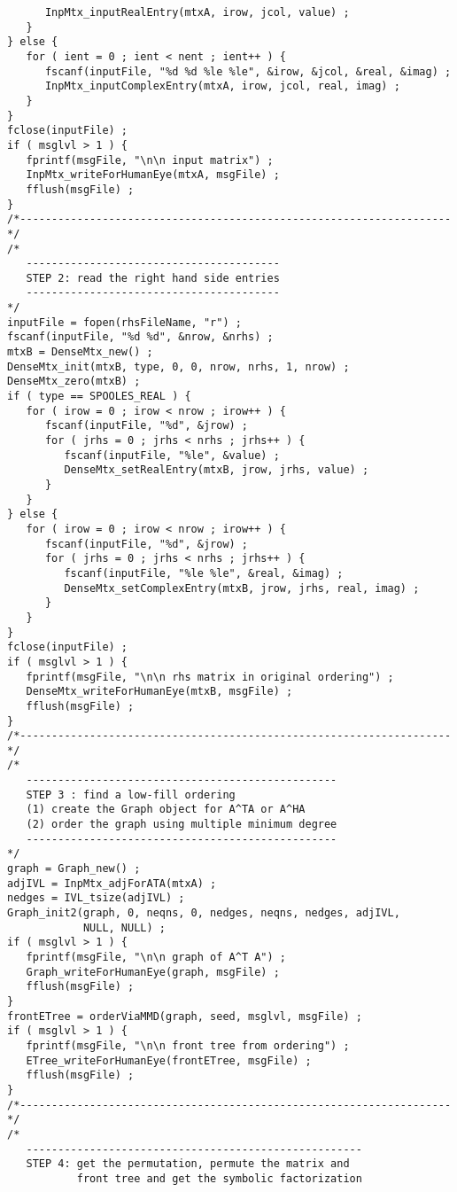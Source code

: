 \begin{verbatim}
      InpMtx_inputRealEntry(mtxA, irow, jcol, value) ;
   }
} else {
   for ( ient = 0 ; ient < nent ; ient++ ) {
      fscanf(inputFile, "%d %d %le %le", &irow, &jcol, &real, &imag) ;
      InpMtx_inputComplexEntry(mtxA, irow, jcol, real, imag) ;
   }
}
fclose(inputFile) ;
if ( msglvl > 1 ) {
   fprintf(msgFile, "\n\n input matrix") ;
   InpMtx_writeForHumanEye(mtxA, msgFile) ;
   fflush(msgFile) ;
}
/*--------------------------------------------------------------------*/
/*
   ----------------------------------------
   STEP 2: read the right hand side entries
   ----------------------------------------
*/
inputFile = fopen(rhsFileName, "r") ;
fscanf(inputFile, "%d %d", &nrow, &nrhs) ;
mtxB = DenseMtx_new() ;
DenseMtx_init(mtxB, type, 0, 0, nrow, nrhs, 1, nrow) ;
DenseMtx_zero(mtxB) ;
if ( type == SPOOLES_REAL ) {
   for ( irow = 0 ; irow < nrow ; irow++ ) {
      fscanf(inputFile, "%d", &jrow) ;
      for ( jrhs = 0 ; jrhs < nrhs ; jrhs++ ) {
         fscanf(inputFile, "%le", &value) ;
         DenseMtx_setRealEntry(mtxB, jrow, jrhs, value) ;
      }
   }
} else {
   for ( irow = 0 ; irow < nrow ; irow++ ) {
      fscanf(inputFile, "%d", &jrow) ;
      for ( jrhs = 0 ; jrhs < nrhs ; jrhs++ ) {
         fscanf(inputFile, "%le %le", &real, &imag) ;
         DenseMtx_setComplexEntry(mtxB, jrow, jrhs, real, imag) ;
      }
   }
}
fclose(inputFile) ;
if ( msglvl > 1 ) {
   fprintf(msgFile, "\n\n rhs matrix in original ordering") ;
   DenseMtx_writeForHumanEye(mtxB, msgFile) ;
   fflush(msgFile) ;
}
/*--------------------------------------------------------------------*/
/*
   -------------------------------------------------
   STEP 3 : find a low-fill ordering
   (1) create the Graph object for A^TA or A^HA
   (2) order the graph using multiple minimum degree
   -------------------------------------------------
*/
graph = Graph_new() ;
adjIVL = InpMtx_adjForATA(mtxA) ;
nedges = IVL_tsize(adjIVL) ;
Graph_init2(graph, 0, neqns, 0, nedges, neqns, nedges, adjIVL,
            NULL, NULL) ;
if ( msglvl > 1 ) {
   fprintf(msgFile, "\n\n graph of A^T A") ;
   Graph_writeForHumanEye(graph, msgFile) ;
   fflush(msgFile) ;
}
frontETree = orderViaMMD(graph, seed, msglvl, msgFile) ;
if ( msglvl > 1 ) {
   fprintf(msgFile, "\n\n front tree from ordering") ;
   ETree_writeForHumanEye(frontETree, msgFile) ;
   fflush(msgFile) ;
}
/*--------------------------------------------------------------------*/
/*
   -----------------------------------------------------
   STEP 4: get the permutation, permute the matrix and 
           front tree and get the symbolic factorization

\end{verbatim}
